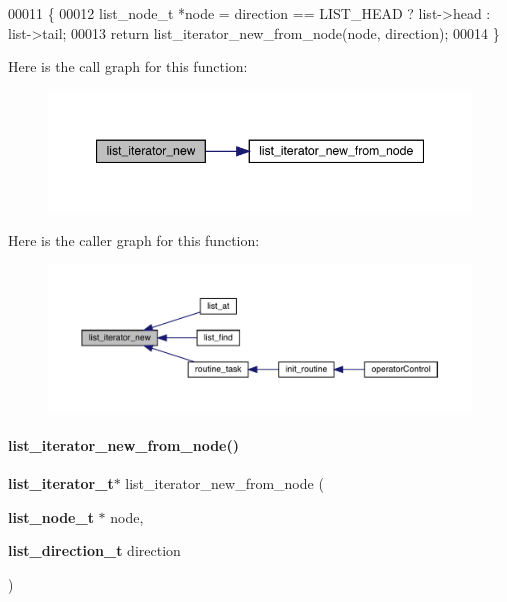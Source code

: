 \begin{DoxyCode}
00011                                                                              \{
00012   list_node_t *node = direction == LIST_HEAD ? list->head : list->tail;
00013   \textcolor{keywordflow}{return} list_iterator_new_from_node(node, direction);
00014 \}
\end{DoxyCode}
Here is the call graph for this function\+:\nopagebreak
\begin{figure}[H]
\begin{center}
\leavevmode
\includegraphics[width=347pt]{list__iterator_8c_a3c956afda343b4a6aaf68fbd4b446733_cgraph}
\end{center}
\end{figure}
Here is the caller graph for this function\+:\nopagebreak
\begin{figure}[H]
\begin{center}
\leavevmode
\includegraphics[width=350pt]{list__iterator_8c_a3c956afda343b4a6aaf68fbd4b446733_icgraph}
\end{center}
\end{figure}
\mbox{\label{list__iterator_8c_af4136a8a27bdc8c0f967a708dd03d575}} 
\paragraph{list\+\_\+iterator\+\_\+new\+\_\+from\+\_\+node()}
{\footnotesize\ttfamily \textbf{ list\+\_\+iterator\+\_\+t}$\ast$ list\+\_\+iterator\+\_\+new\+\_\+from\+\_\+node (\begin{DoxyParamCaption}\item[{\textbf{ list\+\_\+node\+\_\+t} $\ast$}]{node,  }\item[{\textbf{ list\+\_\+direction\+\_\+t}}]{direction }\end{DoxyParamCaption})}




